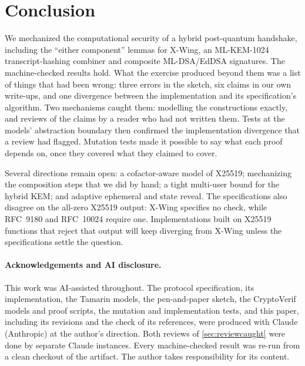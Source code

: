 \section{Conclusion}\label{sec:conclusion}

We mechanized the computational security of a hybrid post-quantum
handshake, including the ``either component'' lemmas for X-Wing, an
ML-KEM-1024 transcript-hashing combiner and composite ML-DSA/EdDSA
signatures. The machine-checked results hold. What the exercise produced
beyond them was a list of things that had been wrong: three errors in the
sketch, six claims in our own write-ups, and one divergence between the
implementation and its specification's algorithm. Two mechanisms caught
them: modelling the constructions exactly, and reviews of the claims by a
reader who had not written them. Tests at the models' abstraction boundary
then confirmed the implementation divergence that a review had flagged.
Mutation tests made it possible to say what each proof depends on, once they
covered what they claimed to cover.

Several directions remain open: a cofactor-aware model of X25519;
mechanizing the composition steps that we did by hand; a tight multi-user
bound for the hybrid KEM; and adaptive ephemeral and state reveal. The
specifications also disagree on the all-zero X25519 output: X-Wing specifies
no check, while RFC~9180 and RFC~10024 require one. Implementations built on
X25519 functions that reject that output will keep diverging from X-Wing
unless the specifications settle the question.

\paragraph{Acknowledgements and AI disclosure.} This work was AI-assisted
throughout. The protocol specification, its implementation, the Tamarin
models, the pen-and-paper sketch, the CryptoVerif models and proof scripts,
the mutation and implementation tests, and this paper, including its
revisions and the check of its references, were produced with Claude
(Anthropic) at the author's direction. Both reviews of
\cref{sec:reviewcaught} were done by separate Claude instances. Every
machine-checked result was re-run from a clean checkout of the artifact.
The author takes responsibility for its content.
